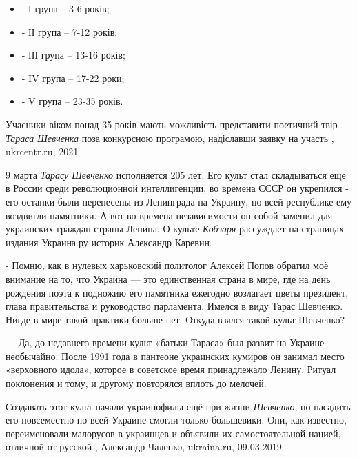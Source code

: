 \begin{itemize}
  \item - І група – 3-6 років;
  \item - ІІ група – 7-12 років;
  \item - ІІІ група – 13-16 років;
  \item - IV група – 17-22 роки;
  \item - V група – 23-35 років.
\end{itemize}

Учасники віком понад 35 років мають можливість представити поетичний твір
\emph{Тараса Шевченка} поза конкурсною програмою, надіславши заявку на участь
, ukrcentr.ru, 2021

9 марта \emph{Тарасу Шевченко} исполняется 205 лет. Его культ стал складываться
еще в России среди революционной интеллигенции, во времена СССР он укрепился -
его останки были перенесены из Ленинграда на Украину, по всей республике ему
воздвигли памятники. А вот во времена независимости он собой заменил для
украинских граждан страны Ленина.  О культе \emph{Кобзаря} рассуждает на
страницах издания Украина.ру историк Александр Каревин.

- Помню, как в нулевых харьковский политолог Алексей Попов обратил моё внимание
на то, что Украина — это единственная страна в мире, где на день рождения поэта
к подножию его памятника ежегодно возлагает цветы президент, глава
правительства и руководство парламента. Имелся в виду Тарас Шевченко. Нигде в
мире такой практики больше нет. Откуда взялся такой культ Шевченко?

— Да, до недавнего времени культ «батьки Тараса» был развит на Украине
необычайно. После 1991 года в пантеоне украинских кумиров он занимал место
«верховного идола», которое в советское время принадлежало Ленину. Ритуал
поклонения и тому, и другому повторялся вплоть до мелочей.

Создавать этот культ начали украинофилы ещё при жизни \emph{Шевченко}, но
насадить его повсеместно по всей Украине смогли только большевики. Они, как
известно, переименовали малорусов в украинцев и объявили их самостоятельной
нацией, отличной от русской
, 
Александр Чаленко, ukraina.ru, 09.03.2019


